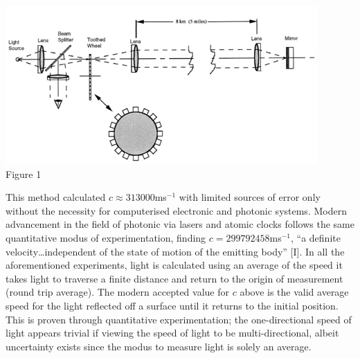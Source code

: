 \documentclass[12pt,letterpaper]{article}
\begin{document}
\begin{center}
    \includegraphics[]{SL gear.jpeg}\\
    \caption {Figure 1}
\end{center}

This method calculated $c \approx 313000$ms$^{-1}$ with limited sources of error only without the necessity for computerised electronic and photonic systems. Modern advancement in the field of photonic via lasers and atomic clocks follows the same quantitative modus of experimentation, finding $c = 299 792 458$ms$^{-1}$, “a definite velocity…independent of the state of motion of the emitting body” [I]. In all the aforementioned experiments, light is calculated using an average of the speed it takes light to traverse a finite distance and return to the origin of measurement (round trip average). The modern accepted value for $c$ above is the valid average speed for the light reflected off a surface until it returns to the initial position. This is proven through quantitative experimentation; the one-directional speed of light appears trivial if viewing the speed of light to be multi-directional, albeit uncertainty exists since the modus to measure light is solely an average.
\end{document}
